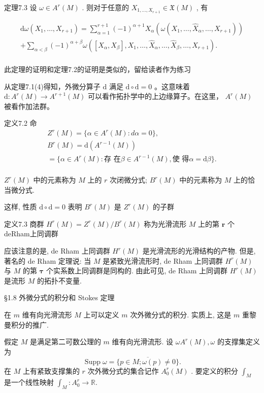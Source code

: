 定理7.3 设  $\omega \in A^{r}(M)$ . 则对于任意的  $X_{1, \dots, X_{r+1}} \in \mathfrak{X}(M)$ , 有

$$
\begin{array}{l} \mathrm {d} \omega \left(X _ {1}, \dots , X _ {r + 1}\right) = \sum_ {\alpha = 1} ^ {r + 1} (- 1) ^ {\alpha + 1} X _ {\alpha} \left(\omega \left(X _ {1}, \dots , \hat {X} _ {\alpha}, \dots , X _ {r + 1}\right)\right) \\ + \sum_ {\alpha <   \beta} (- 1) ^ {\alpha + \beta} \omega ([ X _ {\alpha}, X _ {\beta} ], X _ {1}, \dots , \hat {X} _ {\alpha}, \dots , \hat {X} _ {\beta}, \dots , X _ {r + 1}). \\ \end{array}
$$

此定理的证明和定理7.2的证明是类似的，留给读者作为练习

从定理7.1(4)得知，外微分算子  $\mathrm{d}$  满足  $\mathrm{d} \circ \mathrm{d} = 0$ 。这意味着  $\mathrm{d}: A^r(M) \to A^{r+1}(M)$  可以看作拓扑学中的上边缘算子。在这里， $A^r(M)$  被看作加法群。

定义7.2 命
$$
\begin{array}{l} Z ^ {r} (M) = \{\alpha \in A ^ {r} (M): d \alpha = 0 \}, \\ B ^ {r} (M) = \mathrm {d} \left(A ^ {r - 1} (M)\right) \\ = \{\alpha \in A ^ {r} (M): \text {存 在} \beta \in A ^ {r - 1} (M), \text {使 得} \alpha = \mathrm {d} \beta \}. \\ \end{array}
$$

$Z^{r}(M)$  中的元素称为  $M$  上的  $r$  次闭微分式;  $B^{r}(M)$  中的元素称为  $M$  上的恰当微分式.

这样, 性质  $\mathrm{d} \circ \mathrm{d} = 0$  表明  $B^{r}(M)$  是  $Z^{r}(M)$  的子群

定义7.3 商群  $H^{r}(M) = Z^{r}(M) / B^{r}(M)$  称为光滑流形  $M$  上的第  $\pmb{r}$  个deRham上同调群

应该注意的是, de Rham 上同调群  $H^{r}(M)$  是光滑流形的光滑结构的产物. 但是, 著名的 de Rham 定理说: 当  $M$  是紧致光滑流形时, de Rham 上同调群  $H^{r}(M)$  与  $M$  的第  $\pmb{\tau}$  个实系数上同调群是同构的. 由此可见, de Rham 上同调群  $H^{r}(M)$  是流形  $M$  的拓扑不变量.

 §1.8 外微分式的积分和 Stokes 定理

在  $m$  维有向光滑流形  $M$  上可以定义  $m$  次外微分式的积分. 实质上, 这是  $m$  重黎曼积分的推广.

假定  $M$  是满足第二可数公理的  $m$  维有向光滑流形. 设  $\omega A^{r}(M), \omega$  的支撑集定义为
$$
\operatorname {S u p p} \omega = \overline {{\{p \in M ; \omega (p) \neq 0 \}}}.
$$
在  $M$  上有紧致支撑集的  $r$  次外微分式的集合记作  $A_0^r (M)$  . 要定义的积分  $\int_{M}$  是一个线性映射  $\int_{M}:A_{0}^{r}\to \mathbb{R}.$

